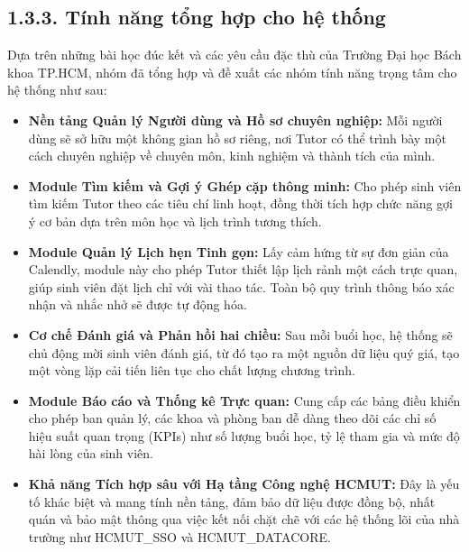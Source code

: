 \subsection*{1.3.3. Tính năng tổng hợp cho hệ thống}
Dựa trên những bài học đúc kết và các yêu cầu đặc thù của Trường Đại học Bách khoa TP.HCM, nhóm đã tổng hợp và đề xuất các nhóm tính năng trọng tâm cho hệ thống như sau:
\begin{itemize}
    \item \textbf{Nền tảng Quản lý Người dùng và Hồ sơ chuyên nghiệp:}  Mỗi người dùng sẽ sở hữu một không gian hồ sơ riêng, nơi Tutor có thể trình bày một cách chuyên nghiệp về chuyên môn, kinh nghiệm và thành tích của mình.

    \item \textbf{Module Tìm kiếm và Gợi ý Ghép cặp thông minh:}  Cho phép sinh viên tìm kiếm Tutor theo các tiêu chí linh hoạt, đồng thời tích hợp chức năng gợi ý cơ bản dựa trên môn học và lịch trình tương thích.

    \item \textbf{Module Quản lý Lịch hẹn Tinh gọn:}  Lấy cảm hứng từ sự đơn giản của Calendly, module này cho phép Tutor thiết lập lịch rảnh một cách trực quan, giúp sinh viên đặt lịch chỉ với vài thao tác. Toàn bộ quy trình thông báo xác nhận và nhắc nhở sẽ được tự động hóa.

    \item \textbf{Cơ chế Đánh giá và Phản hồi hai chiều:}  Sau mỗi buổi học, hệ thống sẽ chủ động mời sinh viên đánh giá, từ đó tạo ra một nguồn dữ liệu quý giá, tạo một vòng lặp cải tiến liên tục cho chất lượng chương trình.

    \item \textbf{Module Báo cáo và Thống kê Trực quan:}  Cung cấp các bảng điều khiển cho phép ban quản lý, các khoa và phòng ban dễ dàng theo dõi các chỉ số hiệu suất quan trọng (KPIs) như số lượng buổi học, tỷ lệ tham gia và mức độ hài lòng của sinh viên.

    \item \textbf{Khả năng Tích hợp sâu với Hạ tầng Công nghệ HCMUT:}  Đây là yếu tố khác biệt và mang tính nền tảng, đảm bảo dữ liệu được đồng bộ, nhất quán và bảo mật thông qua việc kết nối chặt chẽ với các hệ thống lõi của nhà trường như HCMUT\_SSO và HCMUT\_DATACORE.
\end{itemize}
